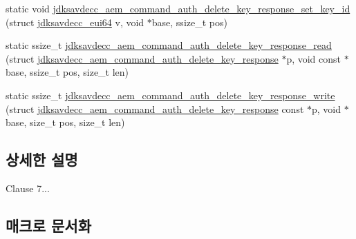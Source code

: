 \begin{DoxyCompactItemize}
\item 
static void \hyperlink{group__command__auth__delete__key__response_ga185caeb179644b1115f709aa9f5ba028}{jdksavdecc\+\_\+aem\+\_\+command\+\_\+auth\+\_\+delete\+\_\+key\+\_\+response\+\_\+set\+\_\+key\+\_\+id} (struct \hyperlink{structjdksavdecc__eui64}{jdksavdecc\+\_\+eui64} v, void $\ast$base, ssize\+\_\+t pos)
\item 
static ssize\+\_\+t \hyperlink{group__command__auth__delete__key__response_ga227aea0168f0db54ed4fc0cf67035930}{jdksavdecc\+\_\+aem\+\_\+command\+\_\+auth\+\_\+delete\+\_\+key\+\_\+response\+\_\+read} (struct \hyperlink{structjdksavdecc__aem__command__auth__delete__key__response}{jdksavdecc\+\_\+aem\+\_\+command\+\_\+auth\+\_\+delete\+\_\+key\+\_\+response} $\ast$p, void const $\ast$base, ssize\+\_\+t pos, size\+\_\+t len)
\item 
static ssize\+\_\+t \hyperlink{group__command__auth__delete__key__response_gae799560cc459366c17c55c661445781f}{jdksavdecc\+\_\+aem\+\_\+command\+\_\+auth\+\_\+delete\+\_\+key\+\_\+response\+\_\+write} (struct \hyperlink{structjdksavdecc__aem__command__auth__delete__key__response}{jdksavdecc\+\_\+aem\+\_\+command\+\_\+auth\+\_\+delete\+\_\+key\+\_\+response} const $\ast$p, void $\ast$base, size\+\_\+t pos, size\+\_\+t len)
\end{DoxyCompactItemize}


\subsection{상세한 설명}
Clause 7... 

\subsection{매크로 문서화}

